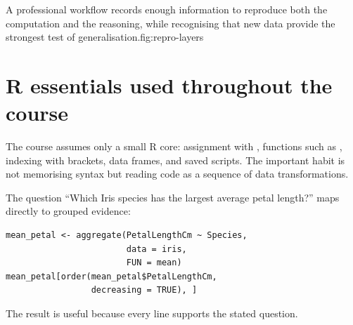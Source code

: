 \begin{utpfig}{A professional workflow records enough information to reproduce both the computation and the reasoning, while recognising that new data provide the strongest test of generalisation.}{fig:repro-layers}
\end{utpfig}

\section{R essentials used throughout the course}
The course assumes only a small R core: assignment with \cmd{<-}, functions such as , indexing with brackets, data frames, and saved scripts. The important habit is not memorising syntax but reading code as a sequence of data transformations.

\begin{workedexample}
The question ``Which Iris species has the largest average petal length?'' maps directly to grouped evidence:
\begin{lstlisting}[style=utpr]
mean_petal <- aggregate(PetalLengthCm ~ Species,
                        data = iris,
                        FUN = mean)
mean_petal[order(mean_petal$PetalLengthCm,
                 decreasing = TRUE), ]
\end{lstlisting}
The result is useful because every line supports the stated question.
\end{workedexample}


